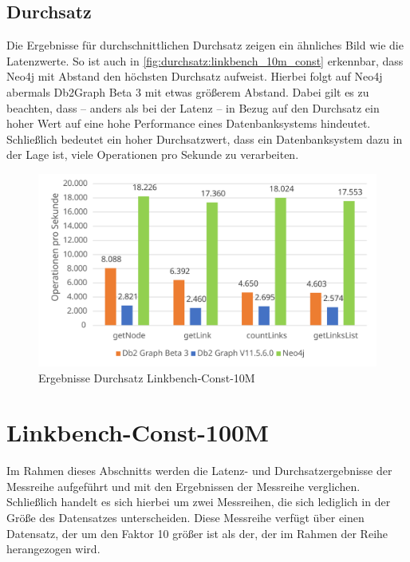 \subsection{Durchsatz}
Die Ergebnisse für durchschnittlichen Durchsatz zeigen ein ähnliches Bild wie die Latenzwerte. So ist auch in \autoref{fig:durchsatz:linkbench_10m_const} erkennbar, dass Neo4j mit Abstand den höchsten Durchsatz aufweist. Hierbei folgt auf Neo4j abermals Db2Graph Beta 3 mit etwas größerem Abstand. Dabei gilt es zu beachten, dass -- anders als bei der Latenz -- in Bezug auf den Durchsatz ein hoher Wert auf eine hohe Performance eines Datenbanksystems hindeutet. Schließlich bedeutet ein hoher Durchsatzwert, dass ein Datenbanksystem dazu in der Lage ist, viele Operationen pro Sekunde zu verarbeiten.

\begin{figure}[!ht]
    \centering
    \includegraphics[width=\textwidth]{images/diagramme/linkbench_10m_const_durchsatz.pdf}
    \caption{Ergebnisse Durchsatz Linkbench-Const-10M}
    \label{fig:durchsatz:linkbench_10m_const}
\end{figure}

\section{Linkbench-Const-100M}
\label{ergebnisse:100m_const}
Im Rahmen dieses Abschnitts werden die Latenz- und Durchsatzergebnisse der Messreihe  aufgeführt und mit den Ergebnissen der Messreihe  verglichen. Schließlich handelt es sich hierbei um zwei Messreihen, die sich lediglich in der Größe des Datensatzes unterscheiden. Diese Messreihe verfügt über einen Datensatz, der um den Faktor 10 größer ist als der, der im Rahmen der Reihe  herangezogen wird. 

